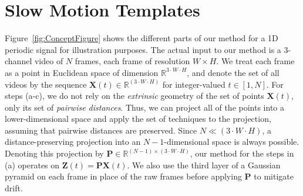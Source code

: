 \documentclass{article}
\newcommand{\mb}{\mathbf}
\begin{document}

\section{Slow Motion Templates}
\label{sec:methods}


Figure~\ref{fig:ConceptFigure} shows the different parts of our method for a 1D periodic signal for illustration purposes. The actual input to our method is a 3-channel video of $N$ frames, each frame of resolution $W \times H$. We treat each frame as a point in Euclidean space of dimension $\mathbb{R}^{3 \cdot W \cdot H}$, and denote the set of all videos by the sequence $\mb{X}(t) \in \mathbb{R}^{(3 \cdot W \cdot H)}$ for integer-valued $t \in [1,N]$. For steps (a-c), we do not rely on the {\em extrinsic} geometry of the set of points $\mb{X}(t)$, only its set of {\em pairwise distances}. Thus, we can project all of the points into a lower-dimensional space and apply the set of techniques to the projection, assuming that pairwise distances are preserved. Since $N \ll (3 \cdot W \cdot H)$, a distance-preserving projection into an $N-1$-dimensional space is always possible. Denoting this projection by $\mb{P} \in \mathbb{R}^{(N-1) \times (3 \cdot W \cdot H)}$, our method for the steps in (a) operates on $\mb{Z}(t) = \mb{P} \mb{X}(t)$.  We also use the third layer of a Gaussian pyramid on each frame in place of the raw frames before applying $\mb{P}$ to mitigate drift.

\end{document}
